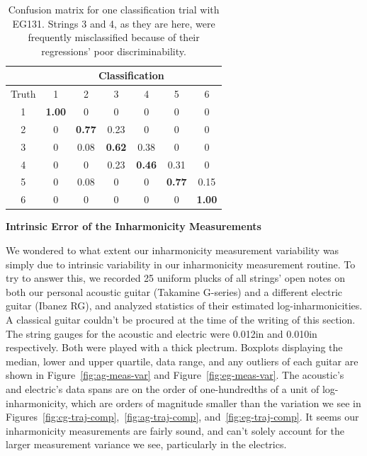 \documentclass[12pt]{cmuthesis}
\begin{document}
\begin{table}
\begin{center}
\begin{tabular}{|c||c|c|c|c|c|c|}
\hline
& \multicolumn{6}{|c|}{Classification} \\
\hline
Truth &1	&2	&3	&4	&5	&6\\
\hline
\hline
1	&\bf{1.00}	& 0	& 0	& 0	&0	& 0 \\ 
\hline
2	&0	& \bf{0.77}	& 0.23	& 0	&0	& 0 \\
\hline
3	&0	& 0.08	& \bf{0.62}	&0.38	& 0	& 0 \\ 
\hline
4	&0	& 0	& 0.23	&\bf{0.46}	& 0.31	& 0 \\
\hline
5	&0	& 0.08	& 0	&0	& \bf{0.77}	& 0.15\\ 
\hline
6	&0	& 0	& 0	&0	&0	& \bf{1.00} \\
\hline
\end{tabular}
\caption{Confusion matrix for one classification trial with EG131. Strings 3 and 4, as they are here, were frequently misclassified because of their regressions' poor discriminability.} 
\label{tab:cf-eg}
\end{center}
\end{table}

\textbf{Intrinsic Error of the Inharmonicity Measurements}

We wondered to what extent our inharmonicity measurement variability was simply due to intrinsic variability in our inharmonicity measurement routine. To try to answer this, we recorded 25 uniform plucks of all strings' open notes on both our personal acoustic guitar (Takamine G-series) and a different electric guitar (Ibanez RG), and analyzed statistics of their estimated log-inharmonicities. A classical guitar couldn't be procured at the time of the writing of this section. The string gauges for the acoustic and electric were 0.012in and 0.010in respectively. Both were played with a thick plectrum. Boxplots displaying the median, lower and upper quartile, data range, and any outliers of each guitar are shown in Figure~\ref{fig:ag-meas-var} and Figure~\ref{fig:eg-meas-var}. The acoustic's and electric's data spans are on the order of one-hundredths of a unit of log-inharmonicity, which are orders of magnitude smaller than the variation we see in Figures~\ref{fig:cg-traj-comp},~\ref{fig:ag-traj-comp}, and~\ref{fig:eg-traj-comp}. It seems our inharmonicity measurements are fairly sound, and can't solely account for the larger measurement variance we see, particularly in the electrics. 
\end{document}

